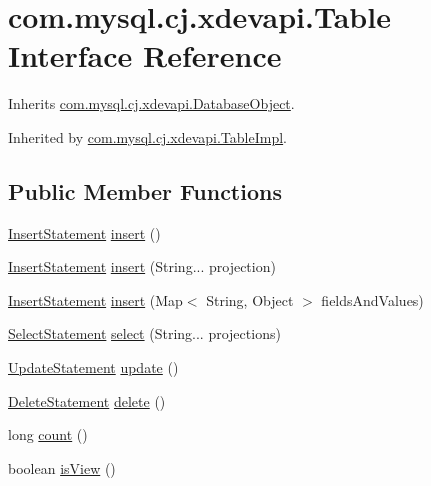 \hypertarget{interfacecom_1_1mysql_1_1cj_1_1xdevapi_1_1_table}{}\section{com.\+mysql.\+cj.\+xdevapi.\+Table Interface Reference}
\label{interfacecom_1_1mysql_1_1cj_1_1xdevapi_1_1_table}


Inherits \mbox{\hyperlink{interfacecom_1_1mysql_1_1cj_1_1xdevapi_1_1_database_object}{com.\+mysql.\+cj.\+xdevapi.\+Database\+Object}}.



Inherited by \mbox{\hyperlink{classcom_1_1mysql_1_1cj_1_1xdevapi_1_1_table_impl}{com.\+mysql.\+cj.\+xdevapi.\+Table\+Impl}}.

\subsection*{Public Member Functions}
\begin{DoxyCompactItemize}
\item 
\mbox{\hyperlink{interfacecom_1_1mysql_1_1cj_1_1xdevapi_1_1_insert_statement}{Insert\+Statement}} \mbox{\hyperlink{interfacecom_1_1mysql_1_1cj_1_1xdevapi_1_1_table_ae9faedd85539146509fa68982fc346f9}{insert}} ()
\item 
\mbox{\hyperlink{interfacecom_1_1mysql_1_1cj_1_1xdevapi_1_1_insert_statement}{Insert\+Statement}} \mbox{\hyperlink{interfacecom_1_1mysql_1_1cj_1_1xdevapi_1_1_table_a67eccc4ea9487430c524001bdd912180}{insert}} (String... projection)
\item 
\mbox{\hyperlink{interfacecom_1_1mysql_1_1cj_1_1xdevapi_1_1_insert_statement}{Insert\+Statement}} \mbox{\hyperlink{interfacecom_1_1mysql_1_1cj_1_1xdevapi_1_1_table_a2a66f6dde400c00f896c02673e7fdc84}{insert}} (Map$<$ String, Object $>$ fields\+And\+Values)
\item 
\mbox{\hyperlink{interfacecom_1_1mysql_1_1cj_1_1xdevapi_1_1_select_statement}{Select\+Statement}} \mbox{\hyperlink{interfacecom_1_1mysql_1_1cj_1_1xdevapi_1_1_table_a36559f114d9638a63d8743f1f1630017}{select}} (String... projections)
\item 
\mbox{\hyperlink{interfacecom_1_1mysql_1_1cj_1_1xdevapi_1_1_update_statement}{Update\+Statement}} \mbox{\hyperlink{interfacecom_1_1mysql_1_1cj_1_1xdevapi_1_1_table_a941215cefeb7236388db7d0390621a17}{update}} ()
\item 
\mbox{\hyperlink{interfacecom_1_1mysql_1_1cj_1_1xdevapi_1_1_delete_statement}{Delete\+Statement}} \mbox{\hyperlink{interfacecom_1_1mysql_1_1cj_1_1xdevapi_1_1_table_a52be4284a88e0a4f243580be570018e2}{delete}} ()
\item 
long \mbox{\hyperlink{interfacecom_1_1mysql_1_1cj_1_1xdevapi_1_1_table_a4f0524bd76d54d6b053187ea09ab2956}{count}} ()
\item 
boolean \mbox{\hyperlink{interfacecom_1_1mysql_1_1cj_1_1xdevapi_1_1_table_a17dc243982bdbd3c0024699d3fb5bd5e}{is\+View}} ()
\end{DoxyCompactItemize}



